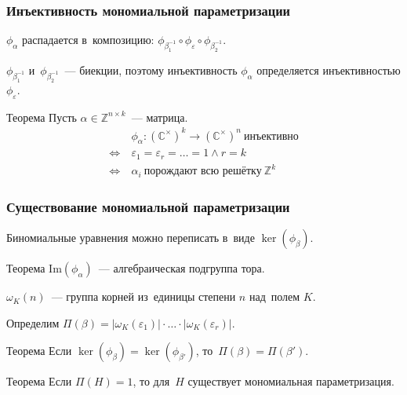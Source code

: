 \documentclass{beamer}
\newcommand{\Z}{\mathbb{Z}}
\begin{document}
\begin{frame}
  \frametitle{Инъективность мономиальной параметризации}

  $\phi_\alpha$ распадается в~композицию: $\phi_{\beta_1^{-1}} \circ \phi_\varepsilon \circ \phi_{\beta_2^{-1}}$.

  $\phi_{\beta_1^{-1}}$ и~$\phi_{\beta_2^{-1}}$~— биекции, поэтому инъективность $\phi_\alpha$ определяется инъективностью $\phi_\varepsilon$.

  \begin{block}{Теорема}
    Пусть $\alpha \in \Z^{n \times k}$~— матрица.
    \begin{align*}
                     \ & \phi_\alpha : (\mathbb{C}^\times)^k \rightarrow (\mathbb{C}^\times)^n\ \text{инъективно} \\
      \Leftrightarrow\ & \varepsilon_1 = \varepsilon_r = \ldots = 1 \wedge r = k \\
      \Leftrightarrow\ & \alpha_i\ \text{порождают всю решётку}\ \Z^k
    \end{align*}
  \end{block}
\end{frame}

\begin{frame}
  \frametitle{Существование мономиальной параметризации}

  Биномиальные уравнения можно переписать в~виде $\ker(\phi_\beta)$.

  \begin{block}{Теорема}
    $\mathrm{Im}(\phi_\alpha)$~— алгебраическая подгруппа тора.
  \end{block}

  $\omega_K(n)$~— группа корней из~единицы степени $n$ над~полем $K$.

  Определим $\Pi(\beta) = |\omega_K(\varepsilon_1)| \cdot \ldots \cdot |\omega_K(\varepsilon_r)|$.

  \begin{block}{Теорема}
    Если $\ker(\phi_{\beta}) = \ker(\phi_{\beta'})$, то~$\Pi(\beta) = \Pi(\beta')$.
  \end{block}

  \begin{block}{Теорема}
    Если $\Pi(H) = 1$, то для~$H$ существует мономиальная параметризация.
  \end{block}
\end{frame}
\end{document}

